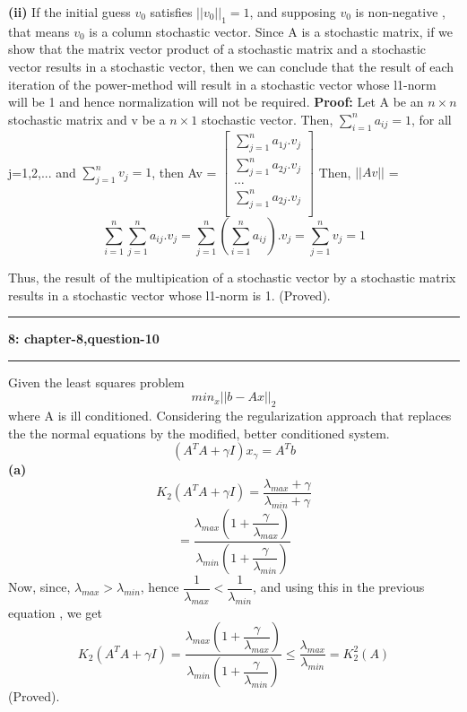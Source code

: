 \documentclass{article}
\newcommand\question[2]{\vspace{.25in}\hrule\textbf{#1: #2}\hrule\vspace{.10in}}
\renewcommand\part[1]{\vspace{.10in}\textbf{(#1)}}
\begin{document}
 \textbf {(ii)} If the initial guess $v_0$ satisfies $||v_0||_1 = 1$, and supposing $v_0$ is non-negative , that means $v_0$ is a column stochastic vector. Since A is a stochastic matrix, if we show that the matrix vector product of a stochastic matrix and a stochastic vector results in a stochastic vector, then we can conclude that the result of each iteration of the power-method will result in a stochastic vector whose l1-norm will be 1 and hence normalization will not be required. \newline
 \textbf {Proof:} Let A be an $n \times n$ stochastic matrix and v be a $n \times 1$ stochastic vector. \newline
 Then, $\sum_{i=1}^n a_{ij} = 1$, for all j=1,2,... and $\sum_{j=1}^n v_{j} = 1$, then \newline
 Av = $\begin{bmatrix}
	 \sum_{j=1}^n a_{1j}.v_j \\
	 \sum_{j=1}^n a_{2j}.v_j \\
	 \dots \\
	 \sum_{j=1}^n a_{2j}.v_j \\
 \end{bmatrix}$
 Then, $||Av||$ = \[\sum_{i=1}^n \sum_{j=1}^n a_{ij}.v_j = \sum_{j=1}^n (\sum_{i=1}^n a_{ij}).v_j = \sum_{j=1}^n v_j = 1\]

 Thus, the result of the multipication of a stochastic vector by a stochastic matrix results in a stochastic vector whose l1-norm is 1. (Proved). \newline

 \question{8}{chapter-8,question-10}
 Given the least squares problem
 \[  min_x ||b - Ax||_2\]
 where A is ill conditioned. Considering the regularization approach that replaces the the normal equations by the modified, better conditioned system.
 \begin{equation}
 (A^TA + \gamma I)x_{\gamma} = A^Tb
 \end{equation}
 \part{a} 
 \[K_2(A^TA + \gamma I) = \dfrac{\lambda_{max} + \gamma}{\lambda_{min} + \gamma} \]
 \[ = \dfrac{\lambda_{max}(1 + \dfrac{\gamma}{\lambda_{max}})}{\lambda_{min}(1 + \dfrac{\gamma}{\lambda_{min}})}\]
 Now, since, $\lambda_{max} > \lambda_{min}$, hence $\dfrac{1}{\lambda_{max}} < \dfrac{1}{\lambda_{min}}$, and using this in the previous equation , we get
 \[K_2(A^TA + \gamma I) = \dfrac{\lambda_{max}(1 + \dfrac{\gamma}{\lambda_{max}})}{\lambda_{min}(1 + \dfrac{\gamma}{\lambda_{min}})} \leq \dfrac{\lambda_{max}}{\lambda_{min}} = K_2^2(A)\]
 (Proved). \newline
\end{document}
